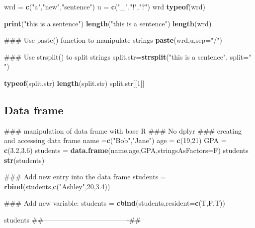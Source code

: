 \documentclass[12pt,]{book}
\newenvironment{Shaded}{\begin{snugshade}}{\end{snugshade}}
\newcommand{\KeywordTok}[1]{\textcolor[rgb]{0.13,0.29,0.53}{\textbf{#1}}}
\newcommand{\DataTypeTok}[1]{\textcolor[rgb]{0.13,0.29,0.53}{#1}}
\newcommand{\DecValTok}[1]{\textcolor[rgb]{0.00,0.00,0.81}{#1}}
\newcommand{\FloatTok}[1]{\textcolor[rgb]{0.00,0.00,0.81}{#1}}
\newcommand{\StringTok}[1]{\textcolor[rgb]{0.31,0.60,0.02}{#1}}
\newcommand{\NormalTok}[1]{#1}
\begin{document}
\begin{Shaded}
\begin{Highlighting}[]
\NormalTok{wrd =}\StringTok{ }\KeywordTok{c}\NormalTok{(}\StringTok{"a"}\NormalTok{,}\StringTok{"new"}\NormalTok{,}\StringTok{"sentence"}\NormalTok{)}
\NormalTok{u =}\StringTok{ }\KeywordTok{c}\NormalTok{(}\StringTok{"_"}\NormalTok{,}\StringTok{"!"}\NormalTok{,}\StringTok{"?"}\NormalTok{)}
\NormalTok{wrd}
\KeywordTok{typeof}\NormalTok{(wrd)}

\KeywordTok{print}\NormalTok{(}\StringTok{"this is a sentence"}\NormalTok{)}
\KeywordTok{length}\NormalTok{(}\StringTok{"this is a sentence"}\NormalTok{)}
\KeywordTok{length}\NormalTok{(wrd)}

\NormalTok{### Use paste() function to manipulate strings}
\KeywordTok{paste}\NormalTok{(wrd,u,}\DataTypeTok{sep=}\StringTok{"/"}\NormalTok{)}

\NormalTok{### Use strsplit() to split strings}
\NormalTok{split.str=}\KeywordTok{strsplit}\NormalTok{(}\StringTok{"this is a sentence"}\NormalTok{, }\DataTypeTok{split=}\StringTok{" "}\NormalTok{)}

\KeywordTok{typeof}\NormalTok{(split.str)}
\KeywordTok{length}\NormalTok{(split.str)}
\NormalTok{split.str[[}\DecValTok{1}\NormalTok{]]}
\end{Highlighting}
\end{Shaded}

\subsection{Data frame}\label{data-frame}

\begin{Shaded}
\begin{Highlighting}[]
\NormalTok{### manipulation of data frame with base R}
\NormalTok{### No dplyr}
\NormalTok{### creating and accessing data frame}
\NormalTok{name =}\KeywordTok{c}\NormalTok{(}\StringTok{"Bob"}\NormalTok{,}\StringTok{"Jane"}\NormalTok{)}
\NormalTok{age =}\StringTok{ }\KeywordTok{c}\NormalTok{(}\DecValTok{19}\NormalTok{,}\DecValTok{21}\NormalTok{)}
\NormalTok{GPA =}\StringTok{ }\KeywordTok{c}\NormalTok{(}\FloatTok{3.2}\NormalTok{,}\FloatTok{3.6}\NormalTok{)}
\NormalTok{students =}\StringTok{ }\KeywordTok{data.frame}\NormalTok{(name,age,GPA,}\DataTypeTok{stringsAsFactors=}\NormalTok{F)}
\NormalTok{students}
\KeywordTok{str}\NormalTok{(students)}


\NormalTok{### Add new entry into the data frame}
\NormalTok{students =}\StringTok{ }\KeywordTok{rbind}\NormalTok{(students,}\KeywordTok{c}\NormalTok{(}\StringTok{"Ashley"}\NormalTok{,}\DecValTok{20}\NormalTok{,}\FloatTok{3.4}\NormalTok{))}

\NormalTok{### Add new variable:}
\NormalTok{students =}\StringTok{ }\KeywordTok{cbind}\NormalTok{(students,}\DataTypeTok{resident=}\KeywordTok{c}\NormalTok{(T,F,T))}

\NormalTok{students}
\NormalTok{##-------------------------------------##}
\end{Highlighting}
\end{Shaded}
\end{document}
